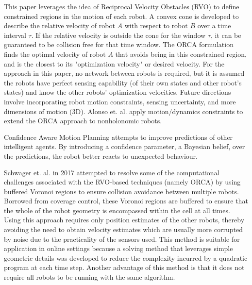 \documentclass[conference]{IEEEtran}
\begin{document}
This paper leverages the idea of Reciprocal Velocity Obstacles (RVO) to define constrained regions in the motion of each robot. A convex cone is developed to describe the relative velocity of robot $A$ with respect to robot $B$ over a time interval $\tau$. If the relative velocity is outside the cone for the window $\tau$, it can be guaranteed to be collision free for that time window. The ORCA formulation finds the optimal velocity of robot $A$ that avoids being in this constrained region, and is the closest to its "optimization velocity" or desired velocity. For the approach in this paper, no network between robots is required, but it is assumed the robots have perfect sensing capability (of their own states and other robot's states) and know the other robots' optimization velocities. Future directions involve incorporating robot motion constraints, sensing uncertainty, and more dimensions of motion (3D). Alonso et. al. \cite{alonso2013optimal} apply motion/dynamics constraints to extend the ORCA approach to nonholonomic robots.

Confidence Aware Motion Planning \cite{fridovich2020confidence} attempts to improve predictions of other intelligent agents. By introducing a confidence parameter, a Bayesian belief, over the predictions, the robot better reacts to unexpected behaviour.

Schwager et. al. in 2017 \cite{schwager2017} attempted to resolve some of the computational challenges associated with the RVO-based techniques (namely ORCA) by using buffered Voronoi regions to ensure collision avoidance between multiple robots. Borrowed from coverage control, these Voronoi regions are buffered to ensure that the whole of the robot geometry is encompassed within the cell at all times. Using this approach requires only position estimates of the other robots, thereby avoiding the need to obtain velocity estimates which are usually more corrupted by noise due to the practicality of the sensors used. This method is suitable for application in online settings because a solving method that leverages simple geometric details was developed to reduce the complexity incurred by a quadratic program at each time step. Another advantage of this method is that it does not require all robots to be running with the same algorithm.

\end{document}

